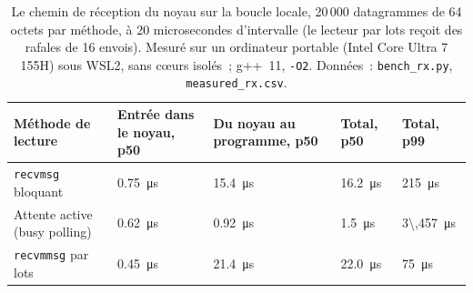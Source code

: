 \label{lst:nw:network-cards-and-kernel-bypass:rx}

\begin{table}[ht]
\centering\small
\begin{tabular}{@{}>{\raggedright\arraybackslash}p{3.6cm}>{\centering\arraybackslash}p{2.6cm}>{\centering\arraybackslash}p{2.6cm}>{\centering\arraybackslash}p{2.1cm}>{\centering\arraybackslash}p{2.1cm}@{}}
\toprule
Méthode de lecture & Entrée dans le noyau, p50 & Du noyau au programme, p50 & Total, p50 & Total, p99 \\
\midrule
\texttt{recvmsg} bloquant & \qty{0.75}{\micro\second} & \qty{15.4}{\micro\second} & \qty{16.2}{\micro\second} & \qty{215}{\micro\second} \\
Attente active (busy polling) & \qty{0.62}{\micro\second} & \qty{0.92}{\micro\second} & \qty{1.5}{\micro\second} & \qty{3\,457}{\micro\second} \\
\texttt{recvmmsg} par lots & \qty{0.45}{\micro\second} & \qty{21.4}{\micro\second} & \qty{22.0}{\micro\second} & \qty{75}{\micro\second} \\
\bottomrule
\end{tabular}
\caption{Le chemin de réception du noyau sur la boucle locale, 20\,000 datagrammes de 64 octets par méthode, à 20 microsecondes d'intervalle (le
lecteur par lots reçoit des rafales de 16 envois). Mesuré sur un ordinateur portable (Intel Core Ultra 7 155H) sous WSL2, sans cœurs isolés~; g++~11,
\texttt{-O2}. Données~: \texttt{bench\_rx.py}, \texttt{measured\_rx.csv}.}\label{tab:nw:network-cards-and-kernel-bypass:measured}
\end{table}

